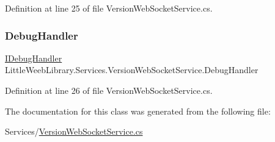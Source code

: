 Definition at line 25 of file Version\+Web\+Socket\+Service.\+cs.

\mbox{\label{class_little_weeb_library_1_1_services_1_1_version_web_socket_service_a13ed681e1a924276595a18a6124028e5}} 
\subsubsection{\texorpdfstring{Debug\+Handler}{DebugHandler}}
{\footnotesize\ttfamily \mbox{\hyperlink{interface_little_weeb_library_1_1_handlers_1_1_i_debug_handler}{I\+Debug\+Handler}} Little\+Weeb\+Library.\+Services.\+Version\+Web\+Socket\+Service.\+Debug\+Handler\hspace{0.3cm}{\ttfamily [private]}}



Definition at line 26 of file Version\+Web\+Socket\+Service.\+cs.



The documentation for this class was generated from the following file\+:\begin{DoxyCompactItemize}
\item 
Services/\mbox{\hyperlink{_version_web_socket_service_8cs}{Version\+Web\+Socket\+Service.\+cs}}\end{DoxyCompactItemize}
